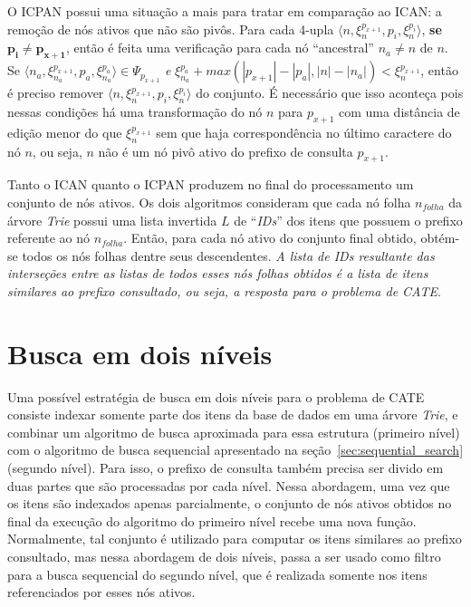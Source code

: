 O ICPAN possui uma situação a mais para tratar em comparação ao ICAN: a remoção de nós ativos que não são pivôs. Para cada 4-upla $\langle n, \xi_{n}^{p_{x + 1}}, p_{i}, \xi_{n}^{p_{i}} \rangle$, \textbf{se $\mathbf{p_{i} \neq p_{x+1}}$}, então é feita uma verificação para cada nó ``ancestral'' $n_{a} \neq n$ de $n$. Se $\langle n_{a}, \xi_{n_{a}}^{p_{x + 1}}, p_{a}, \xi_{n_{a}}^{p_{a}} \rangle \in \Psi_{p_{x+1}}$ \textit{e} $\xi_{n_{a}}^{p_{a}} + max(|p_{x+1}| - |p_{a}|, |n| - |n_{a}|) < \xi_{n}^{p_{x+1}}$, então é preciso remover $\langle n, \xi_{n}^{p_{x + 1}}, p_{i}, \xi_{n}^{p_{i}} \rangle$ do conjunto. É necessário que isso aconteça pois nessas condições há uma transformação do nó $n$ para $p_{x+1}$ com uma distância de edição menor do que $\xi_{n}^{p_{x+1}}$ sem que haja correspondência no último caractere do nó $n$, ou seja, $n$ não é um nó pivô ativo do prefixo de consulta $p_{x+1}$.

Tanto o ICAN quanto o ICPAN produzem no final do processamento um conjunto de nós ativos. Os dois algoritmos consideram que cada nó folha $n_{folha}$ da árvore \textit{Trie} possui uma lista invertida $L$ de ``\textit{IDs}'' dos itens que possuem o prefixo referente ao nó $n_{folha}$. Então, para cada nó ativo do conjunto final obtido, obtém-se todos os nós folhas dentre seus descendentes. \textit{A lista de IDs resultante das interseções entre as listas de todos esses nós folhas obtidos é a lista de itens similares ao prefixo consultado, ou seja, a resposta para o problema de CATE}.

\section{Busca em dois níveis}

Uma possível estratégia de busca em dois níveis para o problema de CATE consiste indexar somente parte dos itens da base de dados em uma árvore \textit{Trie}, e combinar um algoritmo de busca aproximada para essa estrutura (primeiro nível) com o algoritmo de busca sequencial apresentado na seção~\ref{sec:sequential_search} (segundo nível). Para isso, o prefixo de consulta também precisa ser divido em duas partes que são processadas por cada nível. Nessa abordagem, uma vez que os itens são indexados apenas parcialmente, o conjunto de nós ativos obtidos no final da execução do algoritmo do primeiro nível recebe uma nova função. Normalmente, tal conjunto é utilizado para computar os itens similares ao prefixo consultado, mas nessa abordagem de dois níveis, passa a ser usado como filtro para a busca sequencial do segundo nível, que é realizada somente nos itens referenciados por esses nós ativos.
 
